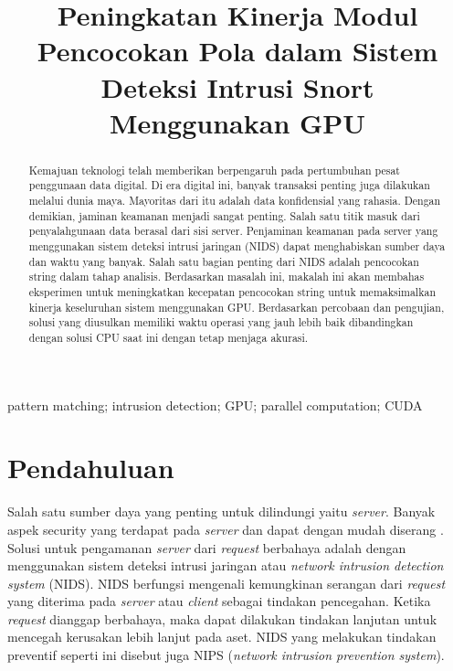 \documentclass[conference]{IEEEtran}
\begin{document}
\title{Peningkatan Kinerja Modul Pencocokan Pola dalam Sistem Deteksi Intrusi Snort Menggunakan GPU}

\author{
\and
{}
}

\maketitle

\begin{abstract}
    Kemajuan teknologi telah memberikan berpengaruh pada pertumbuhan pesat penggunaan data digital. Di era digital ini, banyak transaksi penting juga dilakukan melalui dunia maya. Mayoritas dari itu adalah data konfidensial yang rahasia. Dengan demikian, jaminan keamanan menjadi sangat penting. Salah satu titik masuk dari penyalahgunaan data berasal dari sisi server. Penjaminan keamanan pada server yang menggunakan sistem deteksi intrusi jaringan (NIDS) dapat menghabiskan sumber daya dan waktu yang banyak. Salah satu bagian penting dari NIDS adalah pencocokan string dalam tahap analisis. Berdasarkan masalah ini, makalah ini akan membahas eksperimen untuk meningkatkan kecepatan pencocokan string untuk memaksimalkan kinerja keseluruhan sistem menggunakan GPU. Berdasarkan percobaan dan pengujian, solusi yang diusulkan memiliki waktu operasi yang jauh lebih baik dibandingkan dengan solusi CPU saat ini dengan tetap menjaga akurasi.
\end{abstract}

\begin{IEEEkeywords}
    pattern matching; intrusion detection; GPU; parallel computation; CUDA
\end{IEEEkeywords}

\section{Pendahuluan}

Salah satu sumber daya yang penting untuk dilindungi yaitu \emph{server}. Banyak aspek security yang terdapat pada \emph{server} dan dapat dengan mudah diserang \cite{owasp}. Solusi untuk pengamanan \emph{server} dari \emph{request} berbahaya adalah dengan menggunakan sistem deteksi intrusi jaringan atau \emph{network intrusion detection system} (NIDS). NIDS berfungsi mengenali kemungkinan serangan dari \emph{request} yang diterima pada \emph{server} atau \emph{client} sebagai tindakan pencegahan. Ketika \emph{request} dianggap berbahaya, maka dapat dilakukan tindakan lanjutan untuk mencegah kerusakan lebih lanjut pada aset. NIDS yang melakukan tindakan preventif seperti ini disebut juga NIPS (\emph{network intrusion prevention system}).
\end{document}
